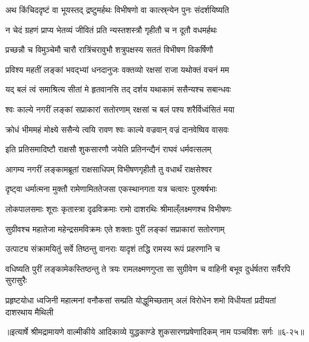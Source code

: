 \twolineshloka
{अथ किंचिददृष्टं वा भूयस्तद् द्रष्टुमर्हथः}
{विभीषणो वा कात्स्र्न्येन पुनः संदर्शयिष्यति} %

\twolineshloka
{न चेदं ग्रहणं प्राप्य भेतव्यं जीवितं प्रति}
{न्यस्तशस्त्रौ गृहीतौ च न दूतौ वधमर्हथः} %

\twolineshloka
{प्रच्छन्नौ च विमुञ्चेमौ चारौ रात्रिंचरावुभौ}
{शत्रुपक्षस्य सततं विभीषण विकर्षिणौ} %

\twolineshloka
{प्रविश्य महतीं लङ्कां भवद्भ्यां धनदानुजः}
{वक्तव्यो रक्षसां राजा यथोक्तं वचनं मम} %

\twolineshloka
{यद् बलं त्वं समाश्रित्य सीतां मे हृतवानसि}
{तद् दर्शय यथाकामं ससैन्यश्च सबान्धवः} %

\twolineshloka
{श्वः काल्ये नगरीं लङ्कां सप्राकारां सतोरणाम्}
{रक्षसां च बलं पश्य शरैर्विध्वंसितं मया} %

\twolineshloka
{क्रोधं भीममहं मोक्ष्ये ससैन्ये त्वयि रावण}
{श्वः काल्ये वज्रवान् वज्रं दानवेष्विव वासवः} %

\twolineshloka
{इति प्रतिसमादिष्टौ राक्षसौ शुकसारणौ}
{जयेति प्रतिनन्द्यैनं राघवं धर्मवत्सलम्} %

\twolineshloka
{आगम्य नगरीं लङ्कामब्रूतां राक्षसाधिपम्}
{विभीषणगृहीतौ तु वधार्थं राक्षसेश्वर} %

\twolineshloka
{दृष्ट्वा धर्मात्मना मुक्तौ रामेणामिततेजसा}
{एकस्थानगता यत्र चत्वारः पुरुषर्षभाः} %

\twolineshloka
{लोकपालसमाः शूराः कृतास्त्रा दृढविक्रमाः}
{रामो दाशरथिः श्रीमाल्ँलक्ष्मणश्च विभीषणः} %

\twolineshloka
{सुग्रीवश्च महातेजा महेन्द्रसमविक्रमः}
{एते शक्ताः पुरीं लङ्कां सप्राकारां सतोरणाम्} %

\twolineshloka
{उत्पाट्य संक्रामयितुं सर्वे तिष्ठन्तु वानराः}
{यादृशं तद्धि रामस्य रूपं प्रहरणानि च} %

\threelineshloka
{वधिष्यति पुरीं लङ्कामेकस्तिष्ठन्तु ते त्रयः}
{रामलक्ष्मणगुप्ता सा सुग्रीवेण च वाहिनी}
{बभूव दुर्धर्षतरा सर्वैरपि सुरासुरैः} %

\twolineshloka
{प्रहृष्टयोधा ध्वजिनी महात्मनां वनौकसां सम्प्रति योद्धुमिच्छताम्}
{अलं विरोधेन शमो विधीयतां प्रदीयतां दाशरथाय मैथिली} %


॥इत्यार्षे श्रीमद्रामायणे वाल्मीकीये आदिकाव्ये युद्धकाण्डे शुकसारणप्रषेणादिकम् नाम पञ्चविंशः सर्गः ॥६-२५॥
